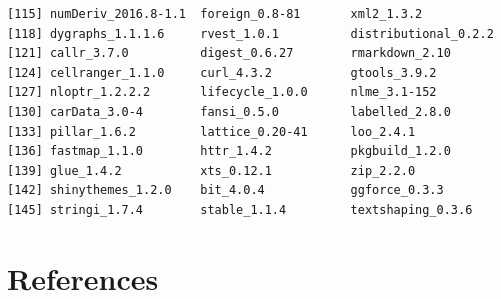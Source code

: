 \documentclass[12pt,twoside]{reedthesis}
\begin{document}
\begin{verbatim}
[115] numDeriv_2016.8-1.1  foreign_0.8-81       xml2_1.3.2          
[118] dygraphs_1.1.1.6     rvest_1.0.1          distributional_0.2.2
[121] callr_3.7.0          digest_0.6.27        rmarkdown_2.10      
[124] cellranger_1.1.0     curl_4.3.2           gtools_3.9.2        
[127] nloptr_1.2.2.2       lifecycle_1.0.0      nlme_3.1-152        
[130] carData_3.0-4        fansi_0.5.0          labelled_2.8.0      
[133] pillar_1.6.2         lattice_0.20-41      loo_2.4.1           
[136] fastmap_1.1.0        httr_1.4.2           pkgbuild_1.2.0      
[139] glue_1.4.2           xts_0.12.1           zip_2.2.0           
[142] shinythemes_1.2.0    bit_4.0.4            ggforce_0.3.3       
[145] stringi_1.7.4        stable_1.1.4         textshaping_0.3.6   
\end{verbatim}
\backmatter

\hypertarget{references}{%
\chapter*{References}\label{references}}


\noindent

\setlength{\parindent}{-0.20in}
\setlength{\leftskip}{0.20in}
\setlength{\parskip}{8pt}
\end{document}
